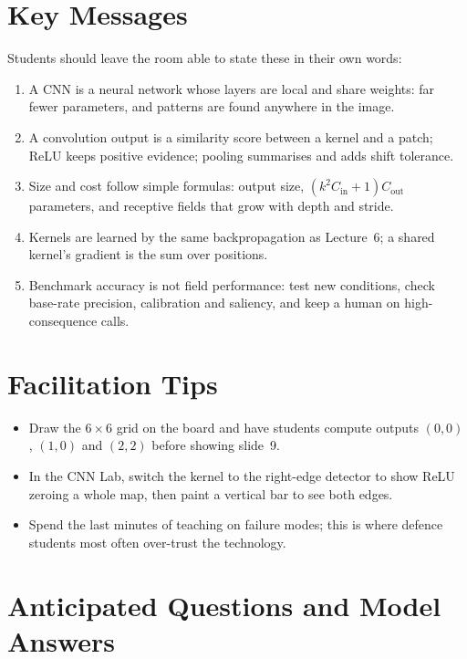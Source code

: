 \documentclass[11pt]{article}
\begin{document}
\section{Key Messages}Students should leave the room able to state these in their own words:\begin{keypoint}\begin{enumerate}\item A CNN is a neural network whose layers are local and share weights: far fewer parameters, and patterns are found anywhere in the image.\item A convolution output is a similarity score between a kernel and a patch; ReLU keeps positive evidence; pooling summarises and adds shift tolerance.\item Size and cost follow simple formulas: output size, $(k^2C_{\text{in}}+1)C_{\text{out}}$ parameters, and receptive fields that grow with depth and stride.\item Kernels are learned by the same backpropagation as Lecture~6; a shared kernel's gradient is the sum over positions.\item Benchmark accuracy is not field performance: test new conditions, check base-rate precision, calibration and saliency, and keep a human on high-consequence calls.\end{enumerate}\end{keypoint}

\section{Facilitation Tips}\begin{itemize}\item Draw the $6\times6$ grid on the board and have students compute outputs $(0,0)$, $(1,0)$ and $(2,2)$ before showing slide~9.\item In the CNN Lab, switch the kernel to the right-edge detector to show ReLU zeroing a whole map, then paint a vertical bar to see both edges.\item Spend the last minutes of teaching on failure modes; this is where defence students most often over-trust the technology.\end{itemize}

\section{Anticipated Questions and Model Answers}
\end{document}
